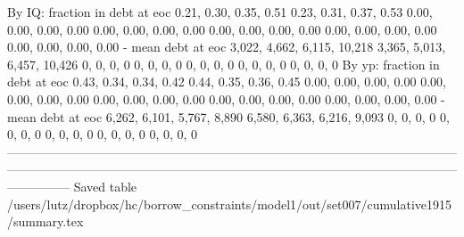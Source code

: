         By IQ: fraction in debt at eoc       0.21, 0.30, 0.35, 0.51       0.23, 0.31, 0.37, 0.53   0.00, 0.00, 0.00, 0.00    0.00, 0.00, 0.00, 0.00      0.00, 0.00, 0.00, 0.00      0.00, 0.00, 0.00, 0.00      0.00, 0.00, 0.00, 0.00
                    - mean debt at eoc  3,022, 4,662, 6,115, 10,218  3,365, 5,013, 6,457, 10,426               0, 0, 0, 0                0, 0, 0, 0                  0, 0, 0, 0                  0, 0, 0, 0                  0, 0, 0, 0
        By yp: fraction in debt at eoc       0.43, 0.34, 0.34, 0.42       0.44, 0.35, 0.36, 0.45   0.00, 0.00, 0.00, 0.00    0.00, 0.00, 0.00, 0.00      0.00, 0.00, 0.00, 0.00      0.00, 0.00, 0.00, 0.00      0.00, 0.00, 0.00, 0.00
                    - mean debt at eoc   6,262, 6,101, 5,767, 8,890   6,580, 6,363, 6,216, 9,093               0, 0, 0, 0                0, 0, 0, 0                  0, 0, 0, 0                  0, 0, 0, 0                  0, 0, 0, 0
---------------------------------------------------------------------------------------------------------------------------------------------------------------------------------------------------------------------------------------
Saved table  /users/lutz/dropbox/hc/borrow_constraints/model1/out/set007/cumulative1915/summary.tex 
